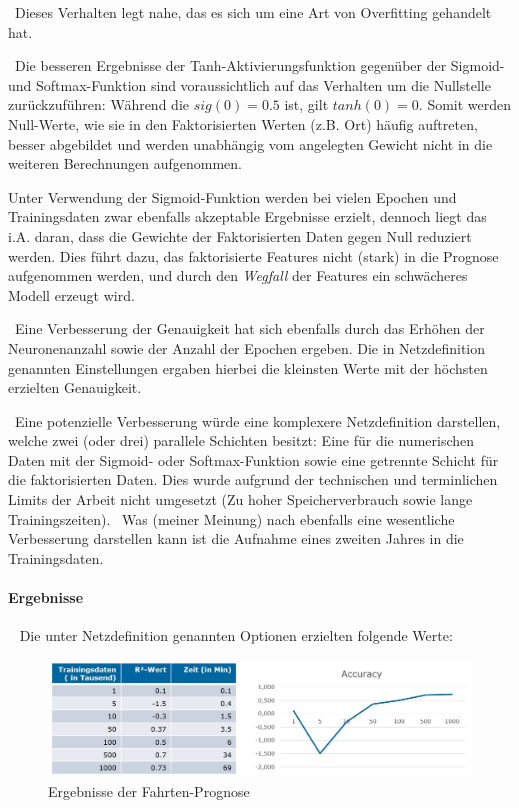 ~\newline Dieses Verhalten legt nahe, das es sich um eine Art von Overfitting gehandelt hat. 

~\newline Die besseren Ergebnisse der Tanh-Aktivierungsfunktion gegenüber der Sigmoid- und Softmax-Funktion sind voraussichtlich auf das Verhalten um die Nullstelle zurückzuführen: Während die $sig(0)=0.5$ ist, gilt $tanh(0)=0$. Somit werden Null-Werte, wie sie in den Faktorisierten Werten (z.B. Ort) häufig auftreten, besser abgebildet und werden unabhängig vom angelegten Gewicht nicht in die weiteren Berechnungen aufgenommen. 

Unter Verwendung der Sigmoid-Funktion werden bei vielen Epochen und Trainingsdaten zwar ebenfalls akzeptable Ergebnisse erzielt, dennoch liegt das i.A. daran, dass die Gewichte der Faktorisierten Daten gegen Null reduziert werden. Dies führt dazu, das faktorisierte Features nicht (stark) in die Prognose aufgenommen werden, und durch den \textit{Wegfall} der Features ein schwächeres Modell erzeugt wird. 

~\newline Eine Verbesserung der Genauigkeit hat sich ebenfalls durch das Erhöhen der Neuronenanzahl sowie der Anzahl der Epochen ergeben. Die in Netzdefinition genannten Einstellungen ergaben hierbei die kleinsten Werte mit der höchsten erzielten Genauigkeit.

~\newline Eine potenzielle Verbesserung würde eine komplexere Netzdefinition darstellen, welche zwei (oder drei) parallele Schichten besitzt: Eine für die numerischen Daten mit der Sigmoid- oder Softmax-Funktion sowie eine getrennte Schicht für die faktorisierten Daten. Dies wurde aufgrund der technischen und terminlichen Limits der Arbeit nicht umgesetzt (Zu hoher Speicherverbrauch sowie lange Trainingszeiten). 
~\newline Was (meiner Meinung) nach ebenfalls eine wesentliche Verbesserung darstellen kann ist die Aufnahme eines zweiten Jahres in die Trainingsdaten.
\paragraph{Ergebnisse} ~\newline
Die unter Netzdefinition genannten Optionen erzielten folgende Werte:

\begin{figure}[h]
	\begin{center}
		\includegraphics[width=0.95\linewidth]{Bilder/FahrtenErgebnisse}
		\caption[Ergebnisse der Trinkgeldprognose]{Ergebnisse der Fahrten-Prognose}
		\label{fig:RidesErg}
	\end{center}
\end{figure}

